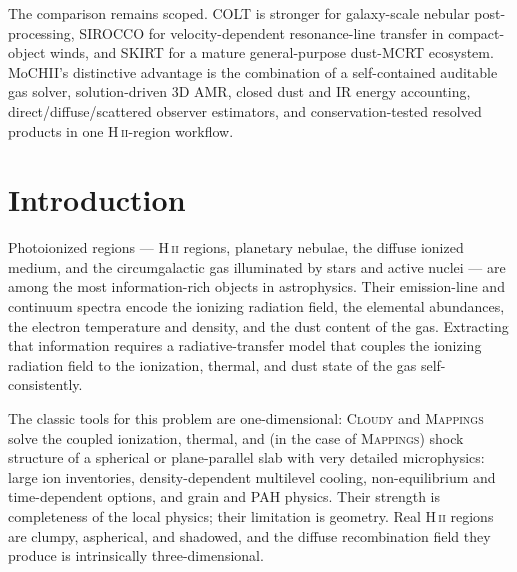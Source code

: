 \documentclass[twocolumn,linenumbers]{aastex702}
\newcommand{\HII}{H\,\textsc{ii}}
\begin{document}
The comparison remains scoped.  COLT is stronger for galaxy-scale nebular
post-processing, SIROCCO for velocity-dependent resonance-line transfer in
compact-object winds, and SKIRT for a mature general-purpose dust-MCRT
ecosystem.  MoCHII's distinctive advantage is the combination of a
self-contained auditable gas solver, solution-driven 3D AMR, closed dust and
IR energy accounting, direct/diffuse/scattered observer estimators, and
conservation-tested resolved products in one H\,\textsc{ii}-region workflow.
\fi


\section{Introduction}
\label{sec:intro}

Photoionized regions --- \HII{} regions, planetary nebulae, the diffuse
ionized medium, and the circumgalactic gas illuminated by stars and
active nuclei --- are among the most information-rich objects in
astrophysics.  Their emission-line and continuum spectra encode the
ionizing radiation field, the elemental abundances, the electron
temperature and density, and the dust content of the gas.  Extracting
that information requires a radiative-transfer model that couples the
ionizing radiation field to the ionization, thermal, and dust state of
the gas self-consistently.

The classic tools for this problem are one-dimensional: \textsc{Cloudy}
\citep{cloudy2017,cloudy2023} and \textsc{Mappings}
\citep{sutherland1993,mappingsv2017} solve the coupled ionization,
thermal, and (in the case of \textsc{Mappings}) shock structure of a
spherical or plane-parallel slab with very detailed microphysics: large
ion inventories, density-dependent multilevel cooling, non-equilibrium
and time-dependent options, and grain and PAH physics.  Their strength is
completeness of the local physics; their limitation is geometry.  Real
\HII{} regions are clumpy, aspherical, and shadowed, and the diffuse
recombination field they produce is intrinsically three-dimensional.
\end{document}
